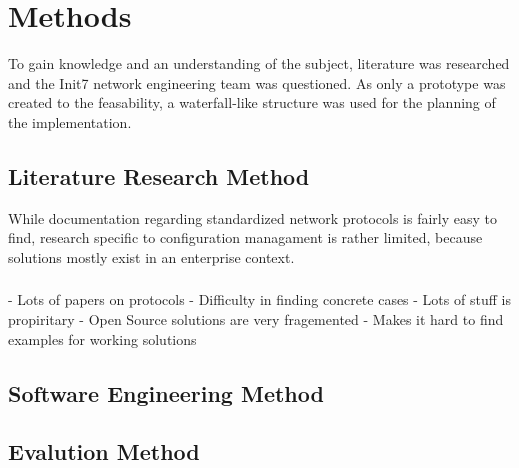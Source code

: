 \chapter{\label{methods}Methods}
\thispagestyle{fancy}


To gain knowledge and an understanding of the subject, literature was researched and
the Init7 network engineering team was questioned. As only a
prototype was created to the feasability, a waterfall-like structure was used for
the planning of the implementation.

\section{Literature Research Method}

While documentation regarding standardized network protocols is fairly easy to find,
research specific to configuration managament is rather limited, because solutions
mostly exist in an enterprise context.



\subsection{}




- Lots of papers on protocols
- Difficulty in finding concrete cases
- Lots of stuff is propiritary
  - Open Source solutions are very fragemented
  - Makes it hard to find examples for working solutions

\section{Software Engineering Method}

\section{Evalution Method}

